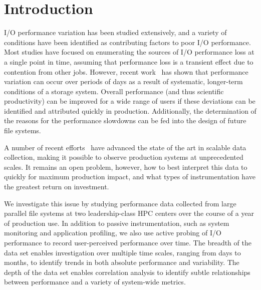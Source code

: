 \section{Introduction}

I/O performance variation has been studied extensively, and a variety of conditions have been identified as contributing factors to poor I/O performance.  Most studies have focused on enumerating the sources of I/O performance loss at a single point in time, assuming that performance loss is a transient effect due to contention from other jobs.  However, recent work~\cite{Lockwood2017} has shown that performance variation can occur over periods of days as a result of systematic, longer-term conditions of a storage system.
%
Overall performance (and thus scientific productivity) can be improved for a
wide range of users if these deviations can be identified and attributed
quickly in production. Additionally, the determination of the reasons for the performance slowdowns can be fed into the design of future file systems. 


A number of recent efforts~\cite{Lockwood2017,Vazhkudai2017guide,Agelastos2014ldms,Kunkel2014siox} have advanced the
state of the art in scalable data collection, making it possible to observe
production systems at unprecedented scales.  It remains an open problem,
however, how to best interpret this data to quickly for maximum production
impact, and what types of instrumentation have the greatest return on
investment.

We investigate this issue by studying performance data collected
from large parallel file systems at two leadership-class HPC centers
over the course of a year of production use.  In addition to passive
instrumentation, such as system monitoring and application profiling,
we also use active probing of I/O performance to record user-perceived
performance over time.  The breadth of the data set enables investigation
over multiple time scales, ranging from days to months, to identify trends in
both absolute performance and variability.  The depth of the data set
enables correlation analysis to identify subtle relationships between
performance and a variety of system-wide metrics.

